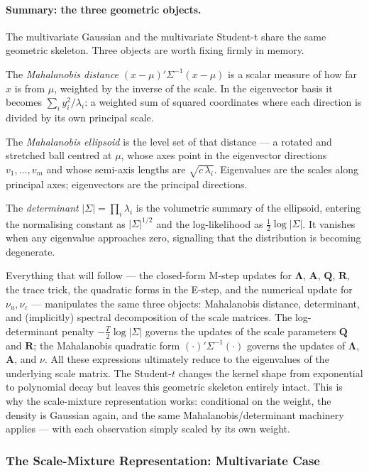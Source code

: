 \documentclass[11pt, a4paper, oneside]{article}
\newcommand{\mL}{\boldsymbol{\Lambda}}
\newcommand{\mA}{\mathbf{A}}
\newcommand{\mR}{\mathbf{R}}
\newcommand{\mQ}{\mathbf{Q}}
\begin{document}
\paragraph{Summary: the three geometric objects.}
The multivariate Gaussian and the multivariate Student-t share the same
geometric skeleton. Three objects are worth fixing firmly in memory.

The \emph{Mahalanobis distance} $(x - \mu)' \Sigma^{-1} (x - \mu)$ is a
scalar measure of how far $x$ is from $\mu$, weighted by the inverse of
the scale. In the eigenvector basis it becomes
$\sum_i y_i^2/\lambda_i$: a weighted sum of squared coordinates where
each direction is divided by its own principal scale.

The \emph{Mahalanobis ellipsoid} is the level set of that distance — a
rotated and stretched ball centred at $\mu$, whose axes point in the
eigenvector directions $v_1, \ldots, v_m$ and whose semi-axis lengths
are $\sqrt{c\,\lambda_i}$. Eigenvalues are the scales along principal
axes; eigenvectors are the principal directions.

The \emph{determinant} $|\Sigma| = \prod_i \lambda_i$ is the volumetric
summary of the ellipsoid, entering the normalising constant as
$|\Sigma|^{1/2}$ and the log-likelihood as $\tfrac{1}{2}\log|\Sigma|$.
It vanishes when any eigenvalue approaches zero, signalling that the
distribution is becoming degenerate.

Everything that will follow — the closed-form M-step updates for
$\mL$, $\mA$, $\mQ$, $\mR$, the trace trick, the quadratic forms in
the E-step, and the numerical update for $\nu_u, \nu_\varepsilon$ —
manipulates the same three objects: Mahalanobis distance, determinant,
and (implicitly) spectral decomposition of the scale matrices. The
log-determinant penalty $-\tfrac{T}{2}\log|\Sigma|$ governs the
updates of the scale parameters $\mQ$ and $\mR$; the Mahalanobis
quadratic form $(\cdot)'\Sigma^{-1}(\cdot)$ governs the updates of
$\mL$, $\mA$, and $\nu$. All these expressions ultimately reduce to
the eigenvalues of the underlying scale matrix. The Student-$t$
changes the kernel shape from exponential to polynomial decay but
leaves this geometric skeleton entirely intact. This is why the
scale-mixture representation works: conditional on the weight, the
density is Gaussian again, and the same Mahalanobis/determinant
machinery applies — with each observation simply scaled by its own
weight.

\newpage

\subsubsection{The Scale-Mixture Representation: Multivariate Case}
\end{document}

